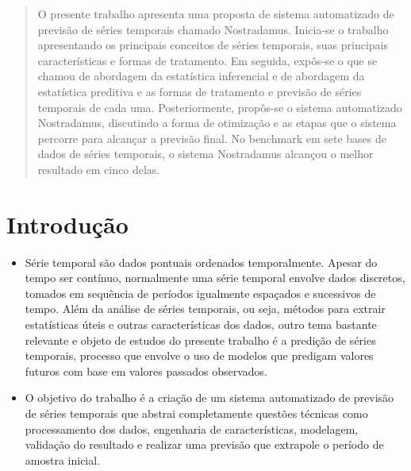 \documentclass[portrait, 24pt, final]{sciposter}
\begin{document}
\begin{multicols}{2}

\begin{abstract}
  O presente trabalho apresenta uma proposta de sistema automatizado de previsão de séries temporais chamado Nostradamus. Inicia-se o trabalho apresentando os principais conceitos de séries temporais, suas principais características e formas de tratamento. Em seguida, expôs-se o que se chamou de abordagem da estatística inferencial e de abordagem da estatística preditiva e as formas de tratamento e previsão de séries temporais de cada uma. Posteriormente, propôs-se o sistema automatizado Nostradamus, discutindo a forma de otimização e as etapas que o sistema percorre para alcançar a previsão final. No benchmark em sete bases de dados de séries temporais, o sistema Nostradamus alcançou o melhor resultado em cinco delas.

\end{abstract}

\section*{Introdução}

\begin{itemize}
\item
	Série temporal são dados pontuais ordenados temporalmente. Apesar do tempo ser contínuo, normalmente uma série temporal envolve dados discretos, tomados em sequência de períodos igualmente espaçados e sucessivos de tempo. Além da análise de séries temporais, ou seja, métodos para extrair estatísticas úteis e outras características dos dados, outro tema bastante relevante e objeto de estudos do presente trabalho é a predição de séries temporais, processo que envolve o uso de modelos que predigam valores futuros com base em valores passados observados.

\item

	O objetivo do trabalho é a criação de um sistema automatizado de previsão de séries temporais que abstrai completamente questões técnicas como processamento dos dados, engenharia de características, modelagem, validação do resultado e realizar uma previsão que extrapole o período de amostra inicial.

\end{itemize}


\end{multicols}
\end{document}

